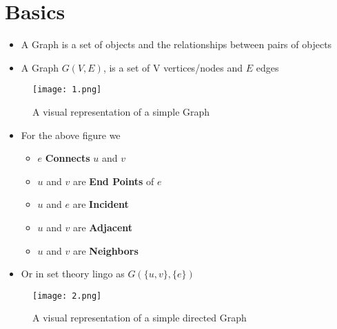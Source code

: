 \chapter{Basics}
\begin{itemize}
\item A Graph is a set of objects and the relationships between pairs of objects
\item A Graph $G(V,E)$, is a set of V vertices/nodes and $E$ edges
\end{itemize}
\begin{figure}[h]
	\centering
\texttt{[image: 1.png]}
\caption{A visual representation of a simple Graph}
\end{figure}
\begin{itemize}
\item For the above figure we 
\begin{itemize}
\item $e$ \textbf{Connects} $u$ and $v$
\item $u$ and $v$ are \textbf{End Points} of $e$
\item $u$ and $e$ are \textbf{Incident}
\item $u$ and $v$ are \textbf{Adjacent}
\item $u$ and $v$ are \textbf{Neighbors}
\end{itemize}
\item Or in set theory lingo as $G(\{u,v\},\{e\})$
\end{itemize}
\begin{figure}[h]
	\centering
	\texttt{[image: 2.png]}
	\caption{A visual representation of a simple directed Graph}
\end{figure}
